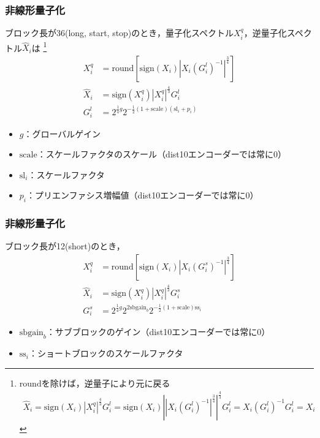 \documentclass[14pt,xcolor=dvipsnames,table,dvipdfmx]{beamer}
\begin{document}
\begin{frame}[c]
    \frametitle{非線形量子化}
    ブロック長が36(long, start, stop)のとき，量子化スペクトル$X_{i}^{q}$，逆量子化スペクトル$\hat{X}_{i}$は
    \footnote{
        $\mathrm{round}$を除けば，逆量子により元に戻る
        \vspace{-5pt}
        \begin{align*}
            \hat{X}_{i} = \mathrm{sign}(X_{i}) |X_{i}^{q}|^{\frac{4}{3}} G^{l}_{i} = \mathrm{sign}(X_{i}) \left| | X_{i} (G_{i}^{l})^{-1} |^{\frac{3}{4}} \right|^{\frac{4}{3}} G_{i}^{l} = X_{i} (G_{i}^{l})^{-1} G_{i}^{l} = X_{i}
        \end{align*}}
    \begin{align}
        X_{i}^{q} &= \mathrm{round}\left[ \mathrm{sign}(X_{i}) \left| X_{i} (G^{l}_{i})^{-1} \right|^{\frac{3}{4}} \right] \\
        \hat{X}_{i} &= \mathrm{sign}(X_{i}^{q}) |X_{i}^{q}|^{\frac{4}{3}} G^{l}_{i} \\
        G^{l}_{i} &= 2^{\frac{1}{4}g} 2^{-\frac{1}{2} (1 + \mathrm{scale})(\mathrm{sl}_{i} + p_{i})}
    \end{align}
    \vspace{-20pt}
    \small
    \begin{itemize}
        \item $g$：グローバルゲイン
        \item $\mathrm{scale}$：スケールファクタのスケール{\scriptsize（dist10エンコーダーでは常に0）}
        \item $\mathrm{sl}_{i}$：スケールファクタ
        \item $p_{i}$：プリエンファシス増幅値{\scriptsize（dist10エンコーダーでは常に0）}
    \end{itemize}
\end{frame}

\begin{frame}[c]
    \frametitle{非線形量子化}
    ブロック長が12(short)のとき，
    \begin{align}
        X_{i}^{q} &= \mathrm{round}\left[ \mathrm{sign}(X_{i}) \left| X_{i} (G_{i}^{s})^{-1} \right|^{\frac{3}{4}} \right] \\
        \hat{X}_{i} &= \mathrm{sign}(X_{i}^{q}) |X_{i}^{q}|^{\frac{4}{3}} G_{i}^{s} \\
        G^{s}_{i} &= 2^{\frac{1}{4}g} 2^{2\mathrm{sbgain}_{b}} 2^{-\frac{1}{2} (1 + \mathrm{scale})\mathrm{ss}_{i}}
    \end{align}
    \vspace{-20pt}
    \small
    \begin{itemize}
        \item $\mathrm{sbgain}_{b}$：サブブロックのゲイン{\scriptsize（dist10エンコーダーでは常に0）}
        \item $\mathrm{ss}_{i}$：ショートブロックのスケールファクタ
    \end{itemize}
\end{frame}
\end{document}

